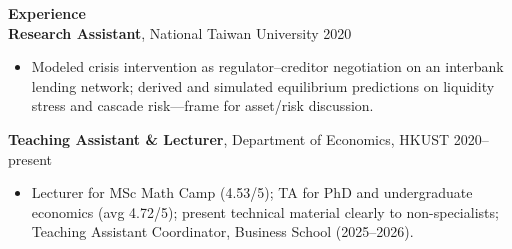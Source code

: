 \documentclass[11pt,letterpaper]{article}
\begin{document}
{\large \textbf{Experience}}\\[-0.5pt]
\textbf{Research Assistant}, National Taiwan University \hfill 2020\\
\vspace{-6pt}
\begin{itemize}
  \item Modeled crisis intervention as regulator--creditor negotiation on an interbank lending network; derived and simulated equilibrium predictions on liquidity stress and cascade risk---frame for asset/risk discussion.
\end{itemize}
\textbf{Teaching Assistant \& Lecturer}, Department of Economics, HKUST \hfill 2020--present\\
\vspace{-6pt}
\begin{itemize}
  \item Lecturer for MSc Math Camp (4.53/5); TA for PhD and undergraduate economics (avg 4.72/5); present technical material clearly to non-specialists; Teaching Assistant Coordinator, Business School (2025--2026).
\end{itemize}

\vspace{0.15pt}
\end{document}
